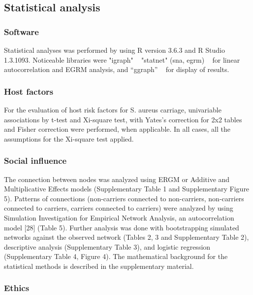 \documentclass[10pt, a4paper, twocolumn]{article} %
\begin{document}
\subsection{Statistical analysis} 

\subsubsection{Software}

Statistical analyses was performed by using R version 3.6.3 and R Studio 1.3.1093. Noticeable libraries were "igraph" ~\cite{ref:igraph} "statnet" (sna, egrm) ~\cite{ref:statnet} for linear autocorrelation and EGRM analysis, and “ggraph” ~\cite{ref:ggraph} for display of results.\\


\subsubsection{Host factors}

For the evaluation of host risk factors for S. aureus carriage, univariable associations by t-test and Xi-square test, with Yates's correction for 2x2 tables and Fisher correction were performed, when applicable. In all cases, all the assumptions for the Xi-square test applied.\\

\subsubsection{Social influence}
 
The connection between nodes was analyzed using ERGM or Additive and Multiplicative Effects models (Supplementary Table 1 and Supplementary Figure 5). Patterns of connections (non-carriers connected to non-carriers, non-carriers connected to carriers, carriers connected to carriers) were analyzed by using Simulation Investigation for Empirical Network Analysis, an autocorrelation model [28] (Table 5). Further analysis was done with bootstrapping simulated networks against the observed network (Tables 2, 3 and Supplementary Table 2), descriptive analysis (Supplementary Table 3), and logistic regression (Supplementary Table 4, Figure 4). The mathematical background for the statistical methods is described in the supplementary material.\\

\subsubsection{Ethics}
 
\end{document}
